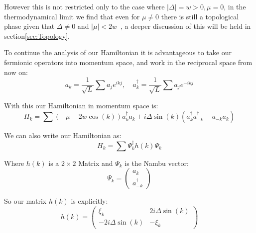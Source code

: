 \documentclass[11pt, a4paper]{article}
\numberwithin{equation}{section}
\begin{document}




However this is not restricted only to the case where $|\Delta| = w > 0, \mu = 0$, in the thermodynamical limit we find that
even for $\mu \neq 0$ there is still a topological phase given that $\Delta \neq 0$ and $|\mu| < 2w$~\cite{Herviou2017}, a deeper discussion of this will be held in section\ref{sec:Topology}.

To continue the analysis of our Hamiltonian it is advantageous to take our fermionic operators into momentum space, and work in the reciprocal space from now on:
\begin{equation}
    a_k = \frac{1}{\sqrt{L}}\sum a_j e^{ikj}, \quad a_k^\dagger = \frac{1}{\sqrt{L}}\sum a_j e^{-ikj}
    \label{eq:operators_momentum_space}
\end{equation}

With this our Hamiltonian in momentum space is:
\begin{equation}
    H_k = \sum (-\mu - 2w\cos(k))a_k^\dagger a_k +  i\Delta \sin(k)(a^\dagger_k a^\dagger_{-k} - a_{-k}a_k)
    \label{eq:Hamiltonian_momentum_space}
\end{equation}

We can also write our Hamiltonian as:
\begin{equation}
    H_k = \sum \Psi^\dagger_k h(k) \Psi_k
\end{equation}

Where $h(k)$ is a $2\times2$ Matrix and $\Psi_k$ is the Nambu vector:
\[
\Psi_k = \begin{pmatrix} a_k \\ a^\dagger_{-k} \end{pmatrix}
\]

So our matrix $h(k)$ is explicitly:
\[
h(k) = \begin{pmatrix}          \xi_k & 2i\Delta\sin(k)\\
                        -2i\Delta\sin(k)& -\xi_k \end{pmatrix}
\]
\end{document}
